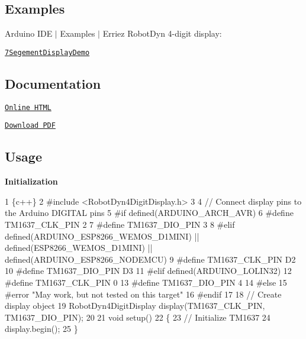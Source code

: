 \subsection*{Examples}

Arduino I\+DE $\vert$ Examples $\vert$ Erriez Robot\+Dyn 4-\/digit display\+:


\begin{DoxyItemize}
\item \href{https://github.com/Erriez/ErriezRobotDyn4DigitDisplay/blob/master/examples/7SegementDisplayDemo/7SegementDisplayDemo.ino}{\tt 7\+Segement\+Display\+Demo}
\end{DoxyItemize}

\subsection*{Documentation}


\begin{DoxyItemize}
\item \href{https://erriez.github.io/ErriezRobotDyn4DigitDisplay}{\tt Online H\+T\+ML}
\item \href{https://github.com/Erriez/ErriezRobotDyn4DigitDisplay/raw/gh-pages/latex/ErriezRobotDyn4DigitDisplayDoc.pdf}{\tt Download P\+DF}
\end{DoxyItemize}

\subsection*{Usage}

{\bfseries Initialization}


\begin{DoxyCode}
1 \{c++\}
2 #include <RobotDyn4DigitDisplay.h>
3 
4 // Connect display pins to the Arduino DIGITAL pins
5 #if defined(ARDUINO\_ARCH\_AVR)
6 #define TM1637\_CLK\_PIN      2
7 #define TM1637\_DIO\_PIN      3
8 #elif defined(ARDUINO\_ESP8266\_WEMOS\_D1MINI) || defined(ESP8266\_WEMOS\_D1MINI) ||
       defined(ARDUINO\_ESP8266\_NODEMCU)
9 #define TM1637\_CLK\_PIN      D2
10 #define TM1637\_DIO\_PIN      D3
11 #elif defined(ARDUINO\_LOLIN32)
12 #define TM1637\_CLK\_PIN      0
13 #define TM1637\_DIO\_PIN      4
14 #else
15 #error "May work, but not tested on this target"
16 #endif
17 
18 // Create display object
19 RobotDyn4DigitDisplay display(TM1637\_CLK\_PIN, TM1637\_DIO\_PIN);
20 
21 void setup()
22 \{
23     // Initialize TM1637
24     display.begin();
25 \}
\end{DoxyCode}


